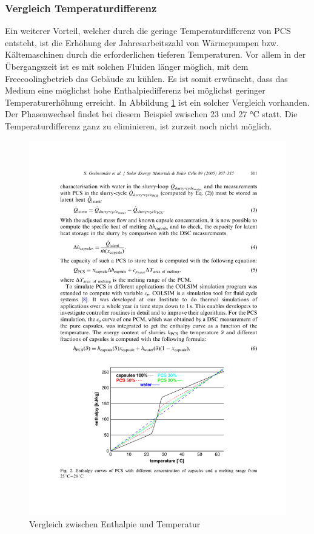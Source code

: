 \documentclass[11pt,a4paper]{scrartcl}
\begin{document}
\subsubsection{Vergleich Temperaturdifferenz}
Ein weiterer Vorteil, welcher durch die geringe Temperaturdifferenz von PCS
entsteht, ist die Erhöhung der Jahresarbeitszahl von Wärmepumpen bzw.
Kältemaschinen durch die erforderlichen tieferen Temperaturen. Vor allem in der
Übergangszeit ist es mit solchen Fluiden länger möglich, mit dem
Freecoolingbetrieb das Gebäude zu kühlen. Es ist somit erwünscht, dass das
Medium eine möglichst hohe Enthalpiedifferenz bei möglichst geringer
Temperaturerhöhung erreicht. In Abbildung \ref{fig:GschwanderEnt} ist ein solcher
Vergleich vorhanden. Der Phasenwechsel findet bei diesem Beispiel zwischen 23
und 27 °C statt. Die Temperaturdifferenz ganz zu eliminieren, ist zurzeit noch
nicht möglich.
\begin{figure}[h!]
\begin{center}
\includegraphics[scale=1]{images/GschwanderEnt.pdf}
\caption{Vergleich zwischen Enthalpie und Temperatur \cite{Gschwander}}
\label{fig:GschwanderEnt}
\end{center}
\end{figure}
\end{document}
